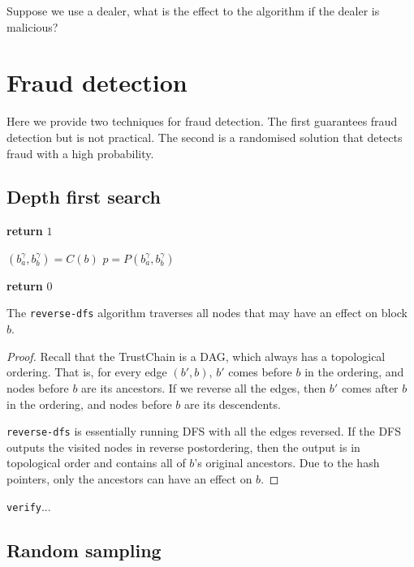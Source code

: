 Suppose we use a dealer, what is the effect to the algorithm if the dealer is
malicious?

\section{Fraud detection}
Here we provide two techniques for fraud detection. The first guarantees fraud
detection but is not practical. The second is a randomised solution that detects
fraud with a high probability.

\subsection{Depth first search}
\begin{algorithmic}

    \State \textbf{return} $1$
\EndIf
{}
\EndIf
\EndFor

\EndProcedure
\end{algorithmic}

\begin{algorithmic}

\State $(b^\gamma_a, b^\gamma_b) = C(b)$
\State $p = P(b^\gamma_a, b^\gamma_b)$
    \EndIf
  \EndIf
\EndIf

\State \textbf{return} $0$
\EndProcedure
\end{algorithmic}

\begin{lemma}
  The \verb!reverse-dfs! algorithm traverses all nodes that may have an effect
  on block $b$.
\end{lemma}
\begin{proof}
  Recall that the TrustChain is a DAG, which always has a topological ordering.
  That is, for every edge $(b', b)$, $b'$ comes before $b$ in the ordering, and
  nodes before $b$ are its ancestors. If we reverse all the edges, then $b'$
  comes after $b$ in the ordering, and nodes before $b$ are its descendents.

  \verb!reverse-dfs! is essentially running DFS with all the edges reversed. If
  the DFS outputs the visited nodes in reverse postordering, then the output is
  in topological order and contains all of $b$'s original ancestors. Due to the
  hash pointers, only the ancestors can have an effect on $b$.
\end{proof}

\begin{lemma}
  \verb!verify!...
\end{lemma}
\subsection{Random sampling}

